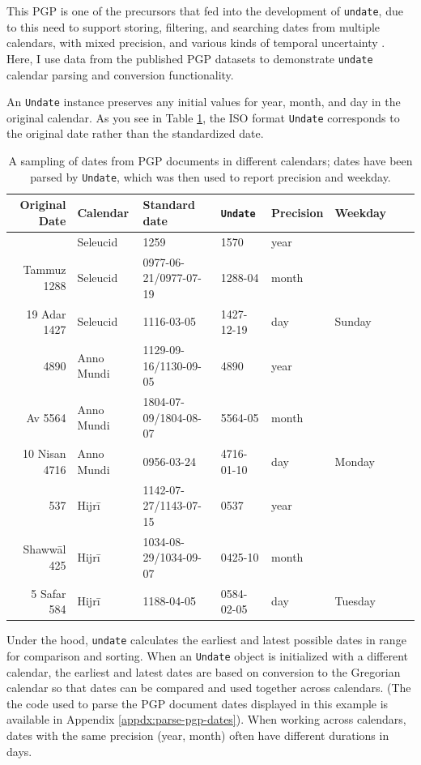 \documentclass[final]{anthology-ch} %
\begin{document}
This PGP is one of the precursors that fed into the development of \texttt{undate}, due to this need to support storing, filtering, and searching dates from multiple calendars, with mixed precision, and various kinds of temporal uncertainty \cite{rustow_dating_2020}. Here, I use data from the published PGP datasets \cite{rustow_princeton_2025} to demonstrate \texttt{undate} calendar parsing and conversion functionality. 

An \texttt{Undate} instance preserves any initial values for year, month, and day in the original calendar. As you see in Table \ref{tab:pgp-parsed-dates}, the ISO format \texttt{Undate} corresponds to the original date rather than the standardized date.

\begin{table}[h]
  \centering 
  \begin{tabular}{rlllllll}
    \toprule
Original Date & Calendar & Standard date & \texttt{Undate} & Precision & Weekday \\ 
\midrule\addlinespace[2.5pt]
1570 & Seleucid & 1259 & 1570 & year &  \\
Tammuz 1288 & Seleucid & 0977-06-21/0977-07-19 & 1288-04 & month &  \\
19 Adar 1427 & Seleucid & 1116-03-05 & 1427-12-19 & day & Sunday \\
\midrule
4890 & Anno Mundi & 1129-09-16/1130-09-05 & 4890 & year &  \\
Av 5564 & Anno Mundi & 1804-07-09/1804-08-07 & 5564-05 & month &  \\
10 Nisan 4716 & Anno Mundi & 0956-03-24 & 4716-01-10 & day & Monday \\
\midrule
537 & Hijrī & 1142-07-27/1143-07-15 & 0537 & year &  \\
Shawwāl 425 & Hijrī & 1034-08-29/1034-09-07 & 0425-10 & month &  \\
5 Safar 584 & Hijrī & 1188-04-05 & 0584-02-05 & day & Tuesday \\
\bottomrule
    \bottomrule
  \end{tabular}
  \caption{A sampling of dates from PGP documents in different calendars; dates have been parsed by \texttt{Undate}, which was then used to report precision and weekday.}
  \label{tab:pgp-parsed-dates}
\end{table}

Under the hood, \texttt{undate} calculates the earliest and latest possible dates in range for comparison and sorting. When an \texttt{Undate} object is initialized with a different calendar, the earliest and latest dates are based on conversion to the Gregorian calendar so that dates can be compared and used together across calendars. (The the code used to parse the PGP document dates displayed in this example is available in Appendix \ref{appdx:parse-pgp-dates}). When working across calendars, dates with the same precision (year, month) often have different durations in days.
\end{document}
